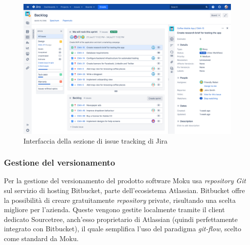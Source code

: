 \begin{figure}[h!]
    \includegraphics[width=\textwidth]{figures/Jira.png}
    \caption[Jira]{Interfaccia della sezione di issue tracking di Jira
    \label{fig:Jira}}
\end{figure}    

\subsubsection{Gestione del versionamento}
Per la gestione del versionamento del prodotto software Moku usa \textit{repository Git} sul servizio di hosting Bitbucket, parte dell'ecosistema Atlassian. Bitbucket offre la possibilità di creare gratuitamente \textit{repository} private, risultando una scelta migliore per l'azienda. Queste vengono gestite localmente tramite il client dedicato Sourcetree, anch'esso proprietario di Atlassian (quindi perfettamente integrato con Bitbucket), il quale semplifica l'uso del paradigma \textit{git-flow}, scelto come standard da Moku.

